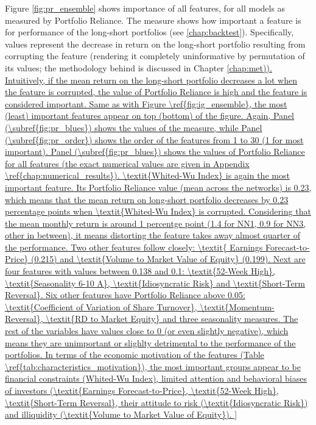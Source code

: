 		Figure \ref{fig:pr_ensemble} shows importance of all features, for all models as measured by Portfolio Reliance. The measure shows how important a feature is for performance of the long-short portfolios (see \ref{chap:backtest}). Specifically, values represent the decrease in return on the long-short portfolio resulting from corrupting the feature (rendering it completely uninformative by permutation of its values; the methodology behind is discussed in Chapter \ref{chap:met)). Intuitively, if the mean return on the long-short portfolio decreases a lot when the feature is corrupted, the value of Portfolio Reliance is high and the feature is considered important. Same as with Figure \ref{fig:ig_ensemble}, the most (least) important features appear on top (bottom) of the figure. Again, Panel (\subref{fig:pr_blues}) shows the values of the measure, while Panel (\subref{fig:pr_order}) shows the order of the features from 1 to 30 (1 for most important). 
			
		Panel (\subref{fig:pr_blues}) shows the values of Portfolio Reliance for all features (the exact numerical values are given in Appendix \ref{chap:numerical_results}). \textit{Whited-Wu Index} is again the most important feature. Its Portfolio Reliance value (mean across the networks) is 0.23, which means that the mean return on long-short portfolio decreases by 0.23 percentage points when \textit{Whited-Wu Index} is corrupted. Considering that the mean monthly return is around 1 percentge point (1.4 for NN1, 0.9 for NN3, other in between), it means distorting the feature takes away almost quarter of the performance. Two other features follow closely: \textit{ Earnings Forecast-to-Price} (0.215) and \textit{Volume to Market Value of Equity} (0.199). Next are four features with values between 0.138 and 0.1: \textit{52-Week High}, \textit{Seasonality 6-10 A}, \textit{Idiosyncratic Risk} and \textit{Short-Term Reversal}. Six other features have Portfolio Reliance above 0.05: \textit{Coefficient of Variation of Share Turnover}, \textit{Momentum-Reversal}, \textit{RD to Market Equity} and three seasonality measures. The rest of the variables have values close to 0 (or even slightly negative), which means they are unimportant or slighlty detrimental to the performance of the portfolios. 
		
		In terms of the economic motivation of the features (Table \ref{tab:characteristics_motivation}), the most important groups appear to be financial constraints (Whited-Wu Index), limited attention and behavioral biases of investors (\textit{Earnings Forecast-to-Price}, \textit{52-Week High}, \textit{Short-Term Reversal}, their attitude to risk (\textit{Idiosyncratic Risk}) and illiquidity (\textit{Volume to Market Value of Equity}).  
		
}
